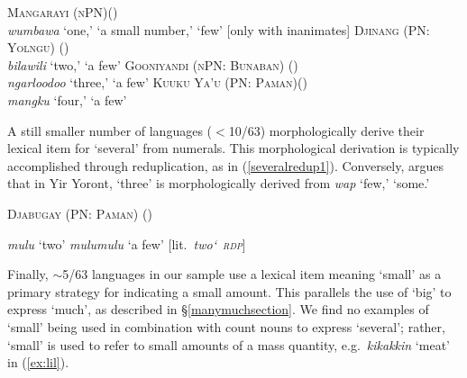 \documentclass[12pt,egregdoesnotlikesansseriftitles]{scrartcl}
\begin{document}

\begin{exe}
\ex \textsc{Mangarayi (nPN)}\hfill (\citealt[93]{merlan89})\\
\textit{wumbawa} `one,' `a small number,' `few' [only with inanimates] \label{fewex0}
  \ex \textsc{Djinang (PN: Yolngu)} \hfill(\citealt[9]{waters83})\\
  \textit{bilawili} `two,' `a few' \label{fewex1}
  \ex \textsc{Gooniyandi (nPN: Bunaban)} \hfill (\citealt[149]{mcgregor90}) \label{fewex2}\\
  \textit{ngarloodoo} `three,' `a few'
  \ex \textsc{Kuuku Ya'u (PN: Paman)}\hfill (\citealt[27,82]{thompson88})\\
  \textit{mangku} `four,' `a few' \label{fewex3}
\end{exe}

A still smaller number of languages ($<$10/63) morphologically derive their lexical item for `several' from numerals. This morphological derivation is typically accomplished through reduplication, as in (\ref{severalredup1}). Conversely, \citet[51]{alpher73} argues that in Yir Yoront, \textit{} `three' is morphologically derived from \textit{wap} `few,' `some.'


\begin{exe}
    \ex \textsc{Djabugay (PN: Paman)} \hfill (\citealt[87]{patz91}) \label{severalredup1}
  \begin{xlist}
    \ex \textit{mulu} `two'
    \ex \textit{mulumulu} `a few' [lit.\ \textit{two\char`~\textsc{rdp}}]
  \end{xlist}
\end{exe}

Finally, $\sim$5/63 languages in our sample use a lexical item meaning `small' as a primary strategy for indicating a small amount. This parallels the use of `big' to express `much', as described in \S\ref{manymuchsection}. We find no examples of `small' being used in combination with count nouns to express `several'; rather, `small' is used to refer to small amounts of a mass quantity, e.g.\ \textit{kikakkin} `meat' in (\ref{ex:lil}).
\end{document}
